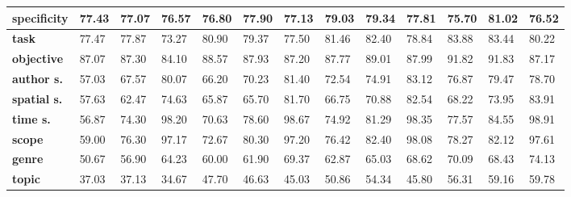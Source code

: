 \begin{tabular}{|l|l|l|l|l|l|l|l|l|l|l|l|l|}
\hline
\textbf{specificity}&77.43&77.07&76.57&76.80&77.90&77.13&79.03&79.34&77.81&75.70&81.02&76.52\\\hline
\textbf{task}&77.47&77.87&73.27&80.90&79.37&77.50&81.46&82.40&78.84&83.88&83.44&80.22\\\hline
\textbf{objective}&87.07&87.30&84.10&88.57&87.93&87.20&87.77&89.01&87.99&91.82&91.83&87.17\\\hline
\textbf{author s.}&57.03&67.57&80.07&66.20&70.23&81.40&72.54&74.91&83.12&76.87&79.47&78.70\\\hline
\textbf{spatial s.}&57.63&62.47&74.63&65.87&65.70&81.70&66.75&70.88&82.54&68.22&73.95&83.91\\\hline
\textbf{time s.}&56.87&74.30&98.20&70.63&78.60&98.67&74.92&81.29&98.35&77.57&84.55&98.91\\\hline
\textbf{scope}&59.00&76.30&97.17&72.67&80.30&97.20&76.42&82.40&98.08&78.27&82.12&97.61\\\hline
\textbf{genre}&50.67&56.90&64.23&60.00&61.90&69.37&62.87&65.03&68.62&70.09&68.43&74.13\\\hline
\textbf{topic}&37.03&37.13&34.67&47.70&46.63&45.03&50.86&54.34&45.80&56.31&59.16&59.78\\\hline
\end{tabular}
